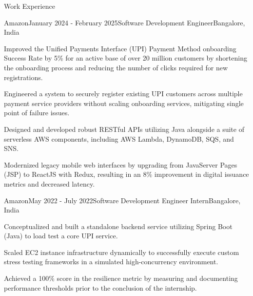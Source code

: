 \documentclass{resume} %
\begin{document}
\begin{rSection}{Work Experience}
    \begin{rSubsection}{Amazon}{January 2024 - February 2025}{Software Development Engineer}{Bangalore, India}
        \item Improved the Unified Payments Interface (UPI)  Payment Method onboarding Success Rate by 5\% for an active base of over 20 million customers by shortening the onboarding process and reducing the number of clicks required for new registrations.
        \item Engineered a system to securely register existing UPI customers across multiple payment service providers without scaling onboarding services, mitigating single point of failure issues.
        \item Designed and developed robust RESTful APIs utilizing Java alongside a suite of serverless AWS components, including AWS Lambda, DynamoDB, SQS, and SNS.
        \item Modernized legacy mobile web interfaces by upgrading from JavaServer Pages (JSP) to ReactJS with Redux, resulting in an 8\% improvement in digital issuance metrics and decreased latency.
    \end{rSubsection}

    \begin{rSubsection}{Amazon}{May 2022 - July 2022}{Software Development Engineer Intern}{Bangalore, India}
        \item Conceptualized and built a standalone backend service utilizing Spring Boot (Java) to load test a core UPI service.
        \item Scaled EC2 instance infrastructure dynamically to successfully execute custom stress testing frameworks in a simulated high-concurrency environment.
        \item Achieved a 100\% score in the resilience metric by measuring and documenting performance thresholds prior to the conclusion of the internship.
    \end{rSubsection}
    
\end{rSection}

\end{document}
